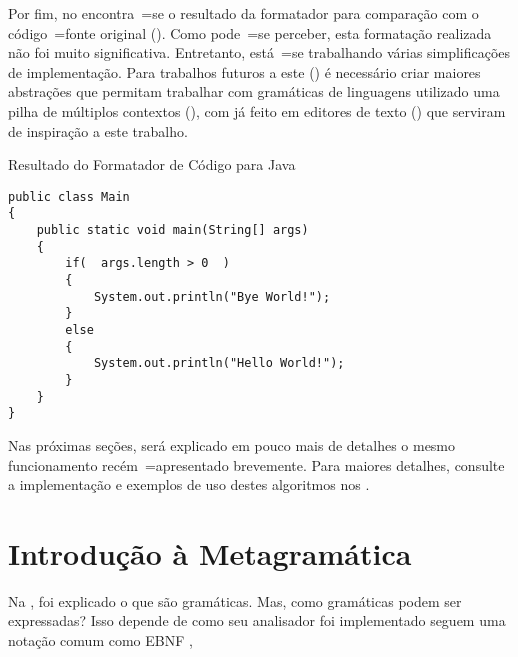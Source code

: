 Por fim,
no  encontra~=se o resultado da formatador para comparação com o código~=fonte original ().
Como pode~=se perceber,
esta formatação realizada não foi muito significativa.
Entretanto,
está~=se trabalhando várias simplificações de implementação.
Para trabalhos futuros a este () é necessário criar maiores abstrações que permitam trabalhar com gramáticas de linguagens utilizado uma pilha de múltiplos contextos (),
com já feito em editores de texto () que serviram de inspiração a este trabalho.
\begin{code}
\caption{Resultado do Formatador de Código para Java}
\label{code:resultadoDoFormatadorDeCodigoParaJava}
\begin{verbatim}
public class Main
{
    public static void main(String[] args)
    {
        if(  args.length > 0  )
        {
            System.out.println("Bye World!");
        }
        else
        {
            System.out.println("Hello World!");
        }
    }
}
\end{verbatim}
\end{code}

Nas próximas seções,
será explicado em pouco mais de detalhes o mesmo funcionamento recém~=apresentado brevemente.
Para maiores detalhes,
consulte a implementação e
exemplos de uso destes algoritmos nos .


\section{Introdução à Metagramática}
\label{section:GrammarsGrammar}

Na ,
foi explicado o que são gramáticas.
Mas,
como gramáticas podem ser expressadas?
Isso depende de como seu analisador foi implementado  seguem uma notação comum como EBNF \cite{teachingEbnf,antlrBookTerrentParr,larkGrammarReference,larkStyleCheat},

